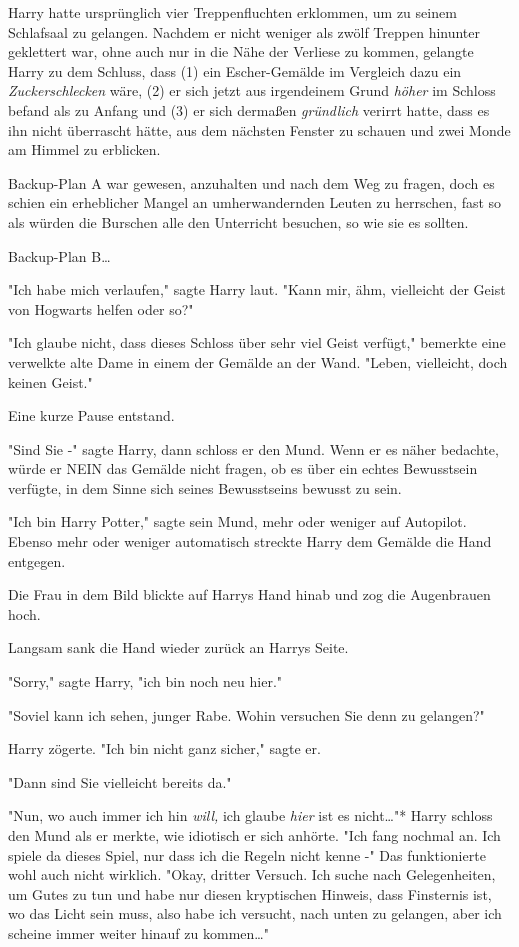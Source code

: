 {Harry hatte ursprünglich vier Treppenfluchten erklommen, um zu seinem Schlafsaal zu gelangen. Nachdem er nicht weniger als zwölf Treppen hinunter geklettert war, ohne auch nur in die Nähe der Verliese zu kommen, gelangte Harry zu dem Schluss, dass (1) ein Escher-Gemälde im Vergleich dazu ein \emph{Zuckerschlecken} wäre, (2) er sich jetzt aus irgendeinem Grund \emph{höher} im Schloss befand als zu Anfang und (3) er sich dermaßen \emph{gründlich} verirrt hatte, dass es ihn nicht überrascht hätte, aus dem nächsten Fenster zu schauen und zwei Monde am Himmel zu erblicken.

Backup-Plan A war gewesen, anzuhalten und nach dem Weg zu fragen, doch es schien ein erheblicher Mangel an umherwandernden Leuten zu herrschen, fast so als würden die Burschen alle den Unterricht besuchen, so wie sie es sollten.

Backup-Plan B…

"Ich habe mich verlaufen," sagte Harry laut. "Kann mir, ähm, vielleicht der Geist von Hogwarts helfen oder so?"

"Ich glaube nicht, dass dieses Schloss über sehr viel Geist verfügt," bemerkte eine verwelkte alte Dame in einem der Gemälde an der Wand. "Leben, vielleicht, doch keinen Geist."

Eine kurze Pause entstand.

"Sind Sie -" sagte Harry, dann schloss er den Mund. Wenn er es näher bedachte, würde er NEIN das Gemälde nicht fragen, ob es über ein echtes Bewusstsein verfügte, in dem Sinne sich seines Bewusstseins bewusst zu sein.

"Ich bin Harry Potter," sagte sein Mund, mehr oder weniger auf Autopilot. Ebenso mehr oder weniger automatisch streckte Harry dem Gemälde die Hand entgegen.

Die Frau in dem Bild blickte auf Harrys Hand hinab und zog die Augenbrauen hoch.

Langsam sank die Hand wieder zurück an Harrys Seite.

"Sorry," sagte Harry, "ich bin noch neu hier."

"Soviel kann ich sehen, junger Rabe. Wohin versuchen Sie denn zu gelangen?"

Harry zögerte. "Ich bin nicht ganz sicher," sagte er.

"Dann sind Sie vielleicht bereits da."

"Nun, wo auch immer ich hin \emph{will,} ich glaube \emph{hier} ist es nicht…"* Harry schloss den Mund als er merkte, wie idiotisch er sich anhörte. "Ich fang nochmal an. Ich spiele da dieses Spiel, nur dass ich die Regeln nicht kenne -" Das funktionierte wohl auch nicht wirklich. "Okay, dritter Versuch. Ich suche nach Gelegenheiten, um Gutes zu tun und habe nur diesen kryptischen Hinweis, dass Finsternis ist, wo das Licht sein muss, also habe ich versucht, nach unten zu gelangen, aber ich scheine immer weiter hinauf zu kommen…"

}
